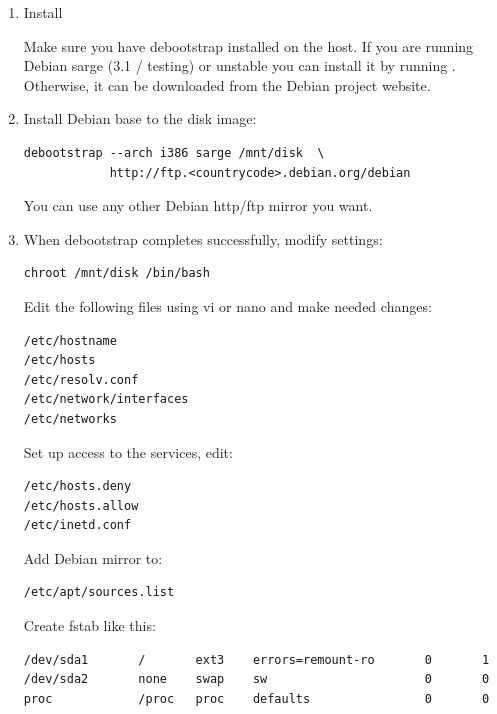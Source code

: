 \documentclass[11pt,twoside,final,openright]{report}
\begin{document}
{\begin{enumerate}
\item Install 

Make sure you have debootstrap installed on the host.  If you are
running Debian sarge (3.1 / testing) or unstable you can install it by
running .  Otherwise, it can be
downloaded from the Debian project website.

\item Install Debian base to the disk image:
\begin{small}\begin{verbatim}
debootstrap --arch i386 sarge /mnt/disk  \
            http://ftp.<countrycode>.debian.org/debian
\end{verbatim}\end{small}

You can use any other Debian http/ftp mirror you want.

\item When debootstrap completes successfully, modify settings:
\begin{small}\begin{verbatim}
chroot /mnt/disk /bin/bash
\end{verbatim}\end{small}

Edit the following files using vi or nano and make needed changes:
\begin{small}\begin{verbatim}
/etc/hostname
/etc/hosts
/etc/resolv.conf
/etc/network/interfaces
/etc/networks
\end{verbatim}\end{small}

Set up access to the services, edit:
\begin{small}\begin{verbatim}
/etc/hosts.deny
/etc/hosts.allow
/etc/inetd.conf
\end{verbatim}\end{small}

Add Debian mirror to:   
\begin{small}\begin{verbatim}
/etc/apt/sources.list
\end{verbatim}\end{small}

Create fstab like this:
\begin{small}\begin{verbatim}
/dev/sda1       /       ext3    errors=remount-ro       0       1
/dev/sda2       none    swap    sw                      0       0
proc            /proc   proc    defaults                0       0
\end{verbatim}\end{small}


\end{enumerate}}
\end{document}

